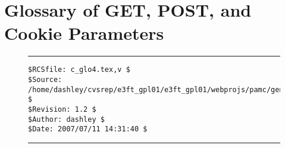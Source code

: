 
\chapter{Glossary of GET, POST, and Cookie Parameters}

\label{cglo4}




\noindent\begin{figure}[!b]
\noindent\rule[-0.25in]{\textwidth}{1pt}
\begin{tiny}
\begin{verbatim}
$RCSfile: c_glo4.tex,v $
$Source: /home/dashley/cvsrep/e3ft_gpl01/e3ft_gpl01/webprojs/pamc/gen_a/docs/manual/man_a/c_glo4/c_glo4.tex,v $
$Revision: 1.2 $
$Author: dashley $
$Date: 2007/07/11 14:31:40 $
\end{verbatim}
\end{tiny}
\noindent\rule[0.25in]{\textwidth}{1pt}
\end{figure}

%
%
